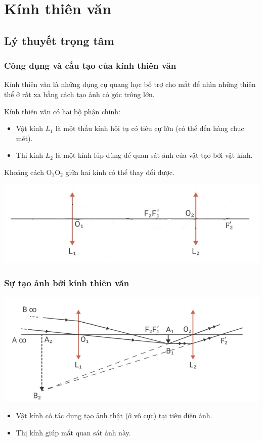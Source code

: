 \chapter{Kính thiên văn}

\section{Lý thuyết trọng tâm}

\subsection{Công dụng và cấu tạo của kính thiên văn}

Kính thiên văn là những dụng cụ quang học bổ trợ cho mắt để nhìn những
thiên thể ở rất xa bằng cách tạo ảnh có góc trông lớn.

Kính thiên văn có hai bộ phận chính:
\begin{itemize}
	\item Vật kính $L_1$ là một thấu kính hội tụ có tiêu cự lớn (có thể đến hàng chục mét).
	\item Thị kính $L_2$ là một kính lúp dùng để quan sát ảnh của vật tạo bởi vật kính.
\end{itemize}

Khoảng cách $\text{O}_1\text{O}_2$ giữa hai kính có thể thay đổi được. 
\begin{center}
	\includegraphics[scale=0.4]{../figs/VN11-PH-43-L-031-1-h54.jpg}
\end{center}

\subsection{Sự tạo ảnh bởi kính thiên văn}
\begin{center}
	\includegraphics[scale=0.7]{../figs/VN11-PH-43-L-031-1-h56.jpg}
\end{center}
\begin{itemize}
	\item Vật kính có tác dụng tạo ảnh thật (ở vô cực) tại tiêu diện ảnh. 
	\item Thị kính giúp mắt quan sát ảnh này.
\end{itemize}

